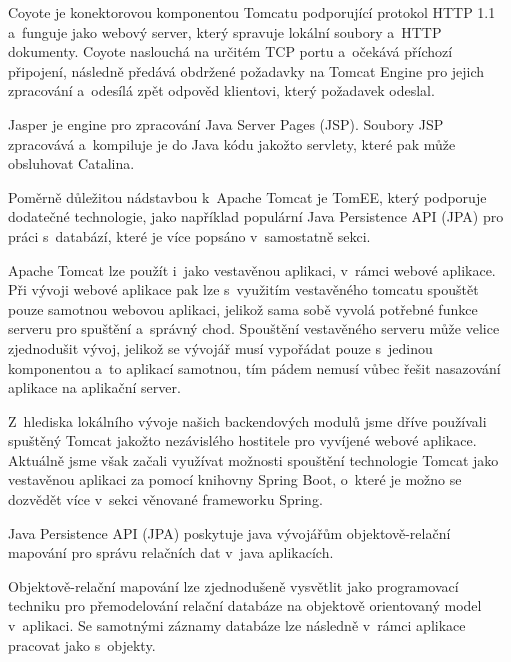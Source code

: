 \documentclass[12pt]{article}
\begin{document}
{%
Coyote je konektorovou komponentou Tomcatu podporující protokol HTTP 1.1 
a~funguje jako webový server, který spravuje lokální soubory a~HTTP dokumenty.
Coyote naslouchá na určitém TCP portu a~očekává příchozí připojení,
následně předává obdržené požadavky na Tomcat Engine pro jejich zpracování
a~odesílá zpět odpověd klientovi, který požadavek odeslal.

Jasper je engine pro zpracování Java Server Pages (JSP).
Soubory JSP zpracovává a~kompiluje je do Java kódu jakožto servlety,
které pak může obsluhovat Catalina.


Poměrně důležitou nádstavbou k~Apache Tomcat je TomEE,
který podporuje dodatečné technologie,
jako například populární Java Persistence API (JPA) pro práci s~databází,
které je více popsáno v~samostatně sekci.

Apache Tomcat lze použít i~jako vestavěnou aplikaci, v~rámci webové aplikace.
Při vývoji webové aplikace pak lze s~využitím vestavěného tomcatu
spouštět pouze samotnou webovou aplikaci, jelikož sama sobě vyvolá
potřebné funkce serveru pro spuštění a~správný chod.
Spouštění vestavěného serveru může velice zjednodušit vývoj,
jelikož se vývojář musí vypořádat pouze s~jedinou komponentou a~to aplikací samotnou,
tím pádem nemusí vůbec řešit nasazování aplikace na aplikační server.


Z~hlediska lokálního vývoje našich backendových modulů jsme dříve používali 
spuštěný Tomcat jakožto nezávislého hostitele pro vyvíjené webové aplikace.
Aktuálně jsme však začali využívat možnosti spouštění technologie Tomcat jako vestavěnou
aplikaci za pomocí knihovny Spring Boot, o~které je možno se dozvědět více v~sekci
věnované frameworku Spring.

Java Persistence API (JPA) poskytuje java vývojářům
objektově-relační mapování pro správu relačních dat v~java aplikacích.

Objektově-relační mapování lze zjednodušeně vysvětlit jako
programovací techniku pro přemodelování relační databáze
na objektově orientovaný model v~aplikaci.
Se samotnými záznamy databáze lze následně v~rámci aplikace pracovat jako s~objekty.


}
\end{document}
